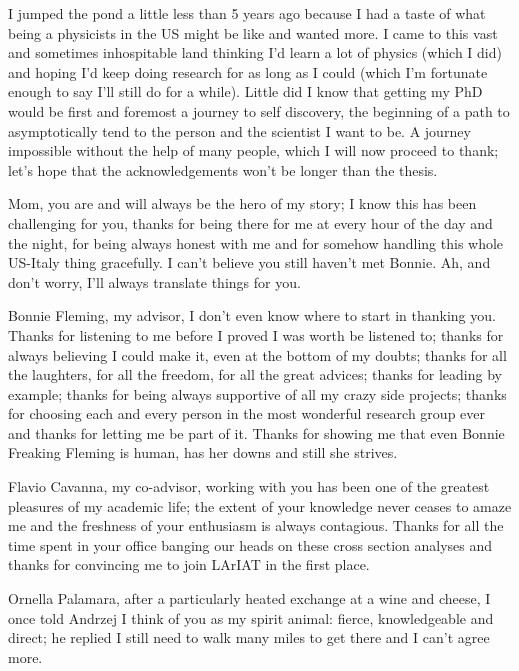 \documentclass[letterpaper,12pt]{yalephd}
\begin{document}


I jumped the pond a little less than 5 years ago because I had a taste of what being a physicists in the US might be like and wanted more.  I came to this vast and sometimes inhospitable land thinking I'd learn a lot of physics (which I did) and hoping I'd keep doing research for as long as I could (which I'm fortunate enough to say I'll still do for a while). Little did I know that getting my PhD would be first and foremost a journey to self discovery, the beginning of a path to asymptotically tend to the person and the scientist I want to be. A journey impossible without the help of many people, which I will now proceed to thank; let's hope that the acknowledgements won't be longer than the thesis.

Mom, you are and will always be the hero of my story; I know this has been challenging for you, thanks for being there for me at every hour of the day and the night, for being always honest with me and for somehow handling this whole US-Italy thing gracefully. I can't believe you still haven't met Bonnie. Ah, and don't worry, I'll always translate things for you. 

Bonnie Fleming, my advisor, I don't even know where to start in thanking you. Thanks for listening to me before I proved I was worth be listened to; thanks for always believing I could make it, even at the bottom of my doubts; thanks for all the laughters, for all the freedom, for all the great advices; thanks for leading by example; thanks for being always supportive of all my crazy side projects; thanks for choosing each and every person in the most wonderful research group ever and thanks for letting me be part of it. Thanks for showing me that even Bonnie Freaking Fleming is human, has her downs and still she strives.

Flavio Cavanna, my co-advisor, working with you has been one of the greatest pleasures of my academic life; the extent of your knowledge never ceases to amaze me and the freshness of your enthusiasm is always contagious. Thanks for all the time spent in your office banging our heads on these cross section analyses and thanks for convincing me to join LArIAT in the first place.

Ornella Palamara, after a particularly heated exchange at a wine and cheese, I once told Andrzej I think of you as my spirit animal: fierce, knowledgeable and direct; he replied I still need to walk many miles to get there and I can't agree more.
\end{document}
